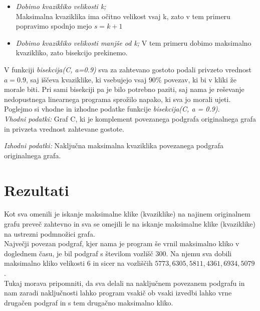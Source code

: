 \documentclass[12pt,a4paper]{amsart}
\theoremstyle{definition}
\theoremstyle{plain}
\begin{document}
\begin{itemize}
\begin{itemize}
\item \textit{Dobimo kvazikliko velikosti k;}\\
Maksimalna kvaziklika ima očitno velikost vsaj k, zato  v tem primeru popravimo spodnjo mejo $s=k+1$\\

\item \textit{Dobimo kvazikliko velikosti manjše od k;}
V tem primeru dobimo  maksimalno kvazikliko, zato bisekcijo prekinemo.\\
\end{itemize}

V funkciji \textit{bisekcija(C, a=0.9)} sva za zahtevano gostoto podali privzeto vrednost $a = 0.9$, saj iščeva kvaziklike, ki vsebujejo vsaj $90\%$ povezav, ki bi v kliki že morale biti. Pri sami bisekciji pa je bilo potrebno paziti, saj nama je reševanje nedopustnega linearnega programa sprožilo napako, ki sva jo morali ujeti. Poglejmo si vhodne in izhodne podatke funkcije \textit{bisekcija(C, a = 0.9)}.\\
 
\textit{Vhodni podatki:} Graf C, ki je komplement povezanega podgrafa originalnega grafa in privzeta vrednost zahtevane gostote.

\textit{Izhodni podatki:} Naključna maksimalna kvaziklika povezanega podgrafa originalnega grafa.

\end{itemize}

\section{Rezultati}

Kot sva omenili je iskanje maksimalne klike (kvaziklike) na najinem originalnem grafu preveč zahtevno in sva se omejili le na iskanje maksimalne klike (kvaziklike) na ustrezni podmnožici grafa.\\

Največji povezan podgraf, kjer nama je program še vrnil maksimalno kliko v doglednem času, je bil podgraf s številom vozlišč $300$. Na njemu sva dobili maksimalno kliko velikosti $6$ in sicer na vozliščih $5773, 6305, 5811, 4361, 6934, 5079$ .\\

Tukaj morava pripomniti, da sva delali na naključnem povezanem podgrafu in nam zaradi naključnosti lahko program vsakič ob vsaki izvedbi lahko vrne drugačen podgraf in s tem drugačno maksimalno kliko.\\
\end{document}
